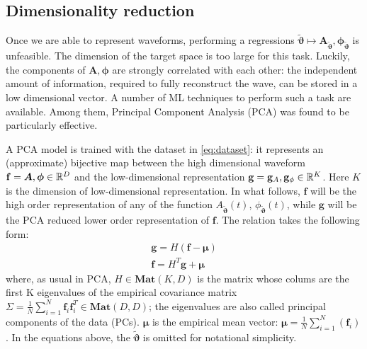 \subsection{Dimensionality reduction}
Once we are able to represent waveforms, performing a regressions ${\tilde{\boldsymbol{\vartheta}}} \longmapsto \boldsymbol{A}_{{\tilde{\boldsymbol{\vartheta}}}}, \boldsymbol{\phi}_{{\tilde{\boldsymbol{\vartheta}}}}$ is unfeasible. The dimension of the target space is too large for this task. Luckily, the components of $\boldsymbol{A}, \boldsymbol{\phi}$ are strongly correlated with each other: the independent amount of information, required to fully reconstruct the wave, can be stored in a low dimensional vector.
A number of ML techniques to perform such a task are available. Among them, Principal Component Analysis (PCA) \cite[ch. 12]{murphy2012machine} was found to be particularly effective.
\par
A PCA model is trained with the dataset in \eqref{eq:dataset}: it represents an (approximate) bijective map between the high dimensional waveform $\mathbf{f} = \boldsymbol{A}, \boldsymbol{\phi} \in \mathbb{R}^D$ and the low-dimensional representation $\mathbf{g} = \mathbf{g}_A , \mathbf{g}_\phi \in \mathbb{R}^K$.
Here $K$ is the dimension of low-dimensional representation.
In what follows, $\mathbf{f}$ will be the high order representation of any of the function $A_{{\tilde{\boldsymbol{\vartheta}}}}(t)$, $\phi_{{\tilde{\boldsymbol{\vartheta}}}}(t)$, while  $\mathbf{g}$ will be the PCA reduced lower order representation of $\mathbf{f}$.
The relation takes the following form:
\begin{align}
	\mathbf{g} = H (\mathbf{f} - \boldsymbol{\mu}) \label{eq:PCA_reduction_model}\\
	\mathbf{f} = H^T \mathbf{g} + \boldsymbol{\mu} \label{eq:PCA_reconstruction_model}
\end{align}
where, as usual in PCA, $H \in \mathbf{Mat}(K,D)$ is the matrix whose colums are the first K eigenvalues of the empirical covariance matrix $\Sigma = \frac{1}{N} \sum_{i=1}^N \mathbf{f}_i \mathbf{f}^T_i \in \mathbf{Mat}(D,D)$; the eigenvalues are also called principal components of the data (PCs). $\boldsymbol{\mu}$ is the empirical mean vector: ${\boldsymbol{\mu} = \frac{1}{N} \sum_{i=1}^N (\boldsymbol{f}_i)}$.
In the equations above, the ${\tilde{\boldsymbol{\vartheta}}}$ is omitted for notational simplicity.
\par

